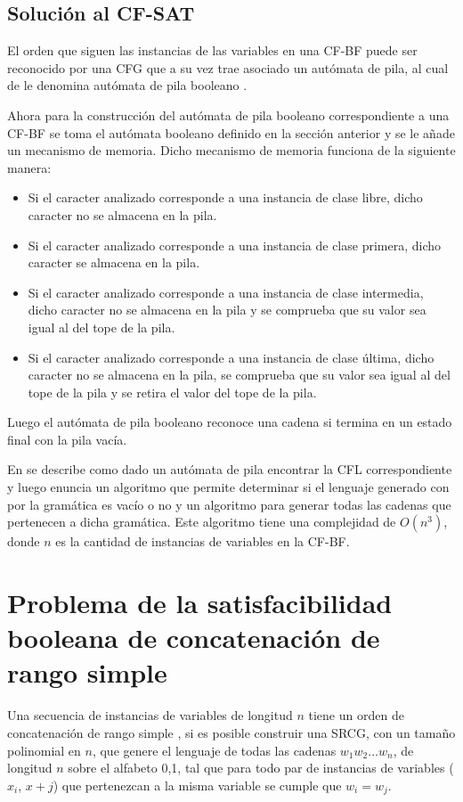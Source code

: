 \subsection{Solución al CF-SAT}

El orden que siguen las instancias de las variables en una CF-BF puede ser reconocido por una CFG que a su vez trae asociado
un autómata de pila, al cual de le denomina autómata de pila booleano \cite{aCFSAT}.

Ahora para la construcción del autómata de pila booleano correspondiente a una CF-BF se toma el autómata booleano definido en
la sección anterior y se le añade un mecanismo de memoria. Dicho mecanismo de memoria funciona de la siguiente manera:

\begin{itemize}
      \item Si el caracter analizado corresponde a una instancia de clase libre, dicho caracter no se almacena en la pila.
      \item Si el caracter analizado corresponde a una instancia de clase primera, dicho caracter se almacena en la pila.
      \item Si el caracter analizado corresponde a una instancia de clase intermedia, dicho caracter no se almacena en la
            pila y se comprueba que su valor sea igual al del tope de la pila.
      \item Si el caracter analizado corresponde a una instancia de clase última, dicho caracter no se almacena en la
            pila, se comprueba que su valor sea igual al del tope de la pila y se retira el valor del tope de la pila.
\end{itemize}
Luego el autómata de pila booleano reconoce una cadena si termina en un estado final con la pila vacía.

En \cite{aCFSAT} se describe como dado un autómata de pila encontrar la CFL correspondiente y luego enuncia un
algoritmo que permite determinar si el lenguaje generado con por la gramática es vacío o no y un algoritmo para
generar todas las cadenas que pertenecen a dicha gramática. Este algoritmo tiene una complejidad de $O(n^3)$, donde $n$
es la cantidad de instancias de variables en la CF-BF.

\section{Problema de la satisfacibilidad booleana de concatenación de rango simple}

Una secuencia de instancias de variables de longitud $n$ tiene un orden de concatenación de rango simple \cite{aSRCSAT},
si es posible construir una SRCG, con un tamaño polinomial en $n$, que genere el lenguaje de todas las cadenas
$w_1w_2 \ldots w_n$, de longitud $n$ sobre el alfabeto {0,1}, tal que para todo par de instancias de variables
($x_i$, $x+j$) que pertenezcan a la misma variable se cumple que $w_i = w_j$.

